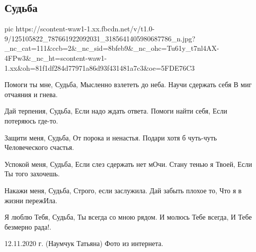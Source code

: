  
 
 

\subsection{Судьба}
\label{sec:15_11_2020.fb.tanya_naumchuk.1.sudjba}

\ifcmt
pic https://scontent-waw1-1.xx.fbcdn.net/v/t1.0-9/125105822_787661922092031_3185641405980687786_n.jpg?_nc_cat=111&ccb=2&_nc_sid=8bfeb9&_nc_ohc=Tu61y_t7nl4AX-4FPw3&_nc_ht=scontent-waw1-1.xx&oh=81f1df284d77971a86d93f431481a7c3&oe=5FDE76C3
\fi

\begin{multicols}{2}
\obeycr
Помоги ты мне, Судьба,
Мысленно взлететь до неба.
Научи сдержать себя
В миг отчаяния и гнева.

Дай терпения, Судьба,
Если надо ждать ответа.
Помоги найти себя,
Если потеряюсь где-то.

Защити меня, Судьба,
От порока и ненастья.
Подари хотя б чуть-чуть
Человеческого счастья.

Успокой меня, Судьба,
Если слез сдержать нет мОчи.
Стану тенью я Твоей,
Если Ты того захочешь.

Накажи меня, Судьба,
Строго, если заслужила.
Дай забыть плохое то, 
Что я в жизни пережИла.

Я люблю Тебя, Судьба,
Ты всегда со мною рядом.
И молюсь Тебе всегда,
И Тебе безмерно рада!.

 12.11.2020 г. (Наумчук Татьяна)
 Фото из интернета.
\restorecr
\end{multicols}
